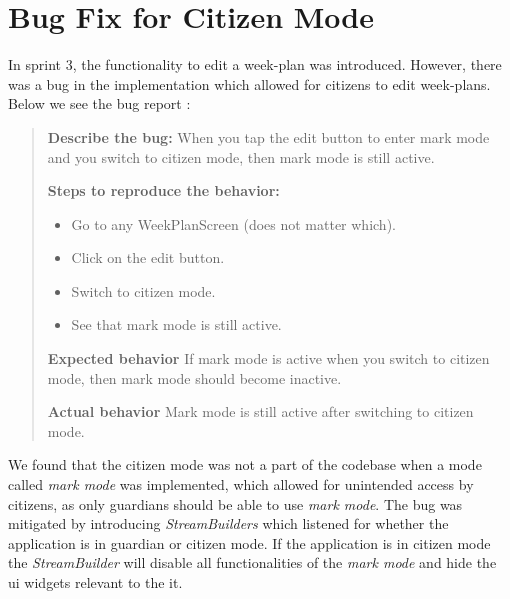 \section{Bug Fix for Citizen Mode}
In sprint 3, the functionality to edit a week-plan was introduced. However, there was a bug in the implementation which allowed for \glspl{citizen} to edit week-plans. Below we see the bug report :

\begin{quote}
  \textbf{Describe the bug:} When you tap the edit button to enter mark mode and you switch to citizen mode, then mark mode is still active.

  \textbf{Steps to reproduce the behavior:}
  \begin{itemize}
    \item Go to any WeekPlanScreen (does not matter which).
    \item Click on the edit button.
    \item Switch to citizen mode.
    \item See that mark mode is still active.
  \end{itemize}

  \textbf{Expected behavior}
  If mark mode is active when you switch to citizen mode, then mark mode should become inactive.

  \textbf{Actual behavior}
  Mark mode is still active after switching to citizen mode.
\end{quote}

We found that the \gls{citizen} mode was not a part of the codebase when a mode called \textit{mark mode} was implemented, which allowed for unintended access by \glspl{citizen}, as only \glspl{guardian} should be able to use \textit{mark mode}. The bug was mitigated by introducing \textit{StreamBuilders} which listened for whether the application is in \gls{guardian} or \gls{citizen} mode. If the application is in \gls{citizen} mode the \textit{StreamBuilder} will disable all functionalities of the \textit{mark mode} and hide the \gls{ui} widgets relevant to the it.
